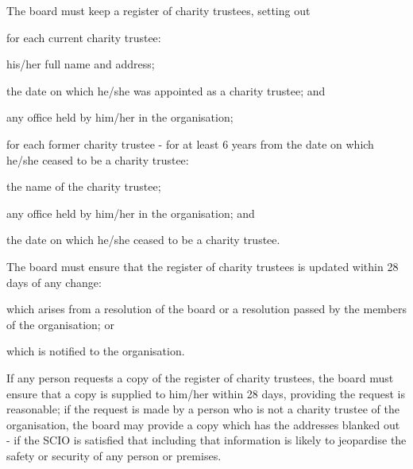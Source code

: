 ﻿\documentclass[a4paper,11pt,onecolumn ]{article}
\begin{document}
\begin{legal}
\item The board must keep a register of charity trustees, setting out
    \begin{legal}
    \item for each current charity trustee:
        \begin{legal}
        \item his/her full name and address; 
        \item the date on which he/she was appointed as a charity trustee; and
        \item any office held by him/her in the organisation;
        \end{legal}
    \item for each former charity trustee - for at least 6 years from the date on which he/she ceased to be a charity trustee:
        \begin{legal}
        \item the name of the charity trustee;
        \item any office held by him/her in the organisation; and
        \item the date on which he/she ceased to be a charity trustee.
        \end{legal}
    \end{legal}
\item The board must ensure that the register of charity trustees is updated within 28 days of any change:
    \begin{legal}
    \item which arises from a resolution of the board or a resolution passed by the members of the organisation; or 
    \item which is notified to the organisation.
    \end{legal}

\item If any person requests a copy of the register of charity trustees, the board must ensure that a copy is supplied to him/her within 28 days, providing the request is reasonable; if the request is made by a person who is not a charity trustee of the organisation, the board may provide a copy which has the addresses blanked out - if the SCIO is satisfied that including that information is likely to jeopardise the safety or security of any person or premises.
\end{legal}
\end{document}
